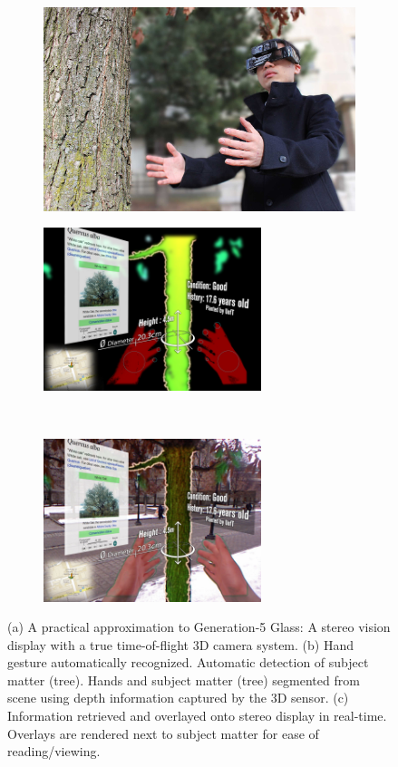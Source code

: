 \begin{figure}
\center
\begin{subfigure}[b]{5.0in}
  \includegraphics[width=5.0in]{ch6/figs/GL4S5_whiteoak_treehug_gesture_cropped.jpg}
  \caption{}
\end{subfigure}

\begin{subfigure}[b]{2.5in}
  \includegraphics[width=2.5in]{ch6/figs/treePrompt2OverlayOnly.jpg}
  \caption{}
\end{subfigure}
~
\begin{subfigure}[b]{2.5in}
  \includegraphics[width=2.5in]{ch6/figs/treePrompt2.jpg}
  \caption{}
\end{subfigure}

  \caption{(a) A practical approximation to Generation-5 Glass: A stereo
           vision display with a true time-of-flight 3D camera system.
           (b) Hand gesture automatically recognized.
           Automatic detection of subject matter (tree).
           Hands and subject matter (tree) segmented from scene using depth
           information captured by the 3D sensor.
           (c) Information retrieved and overlayed onto
           stereo display in real-time. Overlays are rendered next to
           subject matter for ease of reading/viewing. 
           }
  \label{fig:treehugger}
\end{figure}


